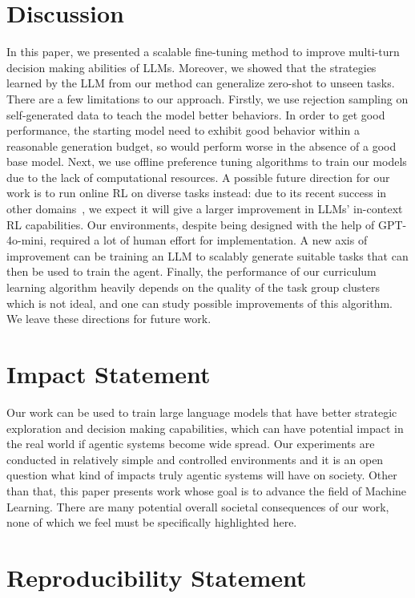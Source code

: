 \section{Discussion}

In this paper, we presented a scalable fine-tuning method to improve multi-turn decision making abilities of LLMs. Moreover, we showed that the strategies learned by the LLM from our method can generalize zero-shot to unseen tasks. There are a few limitations to our approach. Firstly, we use rejection sampling on self-generated data to teach the model better behaviors. In order to get good performance, the starting model need to exhibit good behavior within a reasonable generation budget, so \ours{} would perform worse in the absence of a good base model. Next, we use offline preference tuning algorithms to train our models due to the lack of computational resources. A possible future direction for our work is to run online RL on diverse tasks instead: due to its recent success in other domains~\citep{deepseekai2025deepseekr1incentivizingreasoningcapability}, we expect it will give a larger improvement in LLMs' in-context RL capabilities. Our environments, despite being designed with the help of GPT-4o-mini, required a lot of human effort for implementation. A new axis of improvement can be training an LLM to scalably generate suitable tasks that can then be used to train the agent. Finally, the performance of our curriculum learning algorithm heavily depends on the quality of the task group clusters which is not ideal, and one can study possible improvements of this algorithm. We leave these directions for future work.

\section*{Impact Statement}

Our work can be used to train large language models that have better strategic exploration and decision making capabilities, which can have potential impact in the real world if agentic systems become wide spread. Our experiments are conducted in relatively simple and controlled environments and it is an open question what kind of impacts truly agentic systems will have on society. Other than that, this paper presents work whose goal is to advance the field of Machine Learning. There are many potential overall societal consequences of our work, none of which we feel must be specifically highlighted here.

\section*{Reproducibility Statement}


